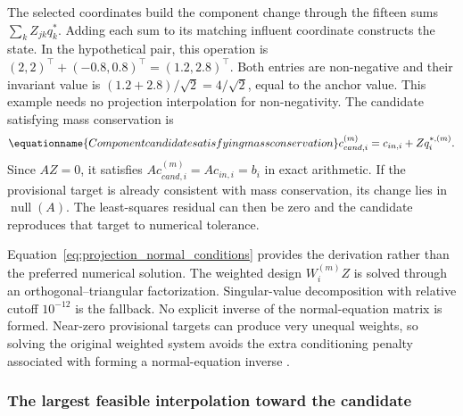 The selected coordinates build the component change through the fifteen sums $\sum_kZ_{jk}q_k^*$. Adding each sum to its matching influent coordinate constructs the state. In the hypothetical pair, this operation is $(2,2)^\top+(-0.8,0.8)^\top=(1.2,2.8)^\top$. Both entries are non-negative and their invariant value is $(1.2+2.8)/\sqrt2=4/\sqrt2$, equal to the anchor value. This example needs no projection interpolation for non-negativity. The candidate satisfying mass conservation is
\begin{equation}
\equationname{Component candidate satisfying mass conservation}
c_{cand,i}^{(m)}=c_{in,i}+Zq_i^{*,(m)}.
\label{eq:projection_conservative_candidate}
\end{equation}
Since $AZ=0$, it satisfies $Ac_{cand,i}^{(m)}=Ac_{in,i}=b_i$ in exact arithmetic. If the provisional target is already consistent with mass conservation, its change lies in $\operatorname{null}(A)$. The least-squares residual can then be zero and the candidate reproduces that target to numerical tolerance.

Equation~\eqref{eq:projection_normal_conditions} provides the derivation rather than the preferred numerical solution. The weighted design $W_i^{(m)}Z$ is solved through an orthogonal--triangular factorization. Singular-value decomposition with relative cutoff $10^{-12}$ is the fallback. No explicit inverse of the normal-equation matrix is formed. Near-zero provisional targets can produce very unequal weights, so solving the original weighted system avoids the extra conditioning penalty associated with forming a normal-equation inverse \citep{BuzziFerraris2013}.

\subsubsection{The largest feasible interpolation toward the candidate}

